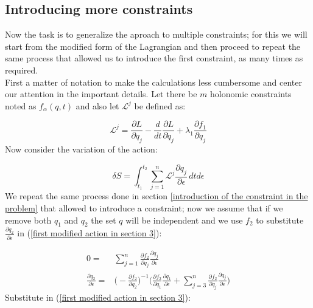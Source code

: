 \documentclass{article}
\begin{document}
\subsection{Introducing more constraints}
Now the task is to generalize the aproach to multiple constraints; for this we will start from the modified form of the Lagrangian and then proceed to repeat the same process that allowed us to introduce the first constraint, as many times as required.  \\
\justify 
First a matter of notation to make the calculations less cumbersome and center our attention in the important details. Let there be $m$ holonomic constraints noted as $f_\alpha(q,t)$ and also let $\mathscr{L}^j$ be defined as:

\begin{equation}
 \mathscr{L}^j = \frac{\partial L}{\partial q_j} - \frac{d}{dt} \frac{\partial L}{\partial \dot{q}_j} + \lambda_1 \frac{\partial f_1}{\partial q_j}
\end{equation}
Now consider the variation of the action:

\begin{equation} \label{first modified action in section 3}
\delta S = \int_{t_1}^{t_2} \sum_{j=1}^{n} \mathscr{L}^j \frac{\partial q_j}{\partial \epsilon} \, dtd\epsilon
\end{equation}
\justify
We repeat the same process done in section \ref{introduction of the  constraint in the problem} that allowed to introduce a constraint; now we assume that if we remove both $q_1$ and $q_2$ the set $q$ will be independent and we use $f_2$ to substitute $\frac{\partial q_2}{\partial \epsilon}$ in (\ref{first modified action in section 3}):

\begin{equation*}
\begin{split}
    0=& \sum_{j=1}^{n} \frac{\partial f_2}{\partial q_j} \frac{\partial q_j}{\partial\epsilon}\\
    \frac{\partial q_2}{\partial \epsilon} =& \bigg(-\frac{\partial f_2}{\partial q_2} \bigg)^{-1} \bigg( \frac{\partial f_2}{\partial q_1} \frac{\partial q_1}{\partial\epsilon}+\sum_{j=3}^{n} \frac{\partial f_2}{\partial q_j} \frac{\partial q_j}{\partial\epsilon} \bigg)
\end{split}
\end{equation*}
Substitute in (\ref{first modified action in section 3}):
\end{document}

